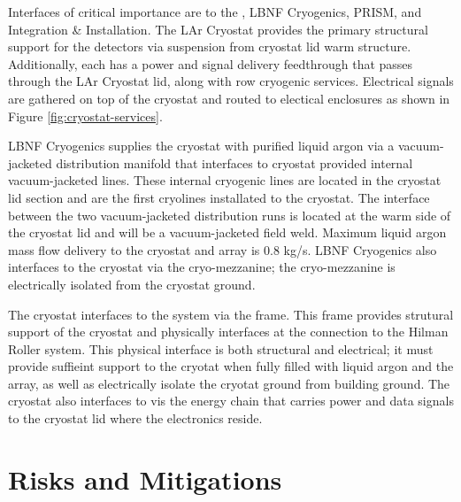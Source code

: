 Interfaces of critical importance are to the , LBNF Cryogenics, PRISM, and Integration \& Installation.  The LAr Cryostat provides the primary structural support for the  detectors via suspension from cryostat lid warm structure.  Additionally, each  has a power and signal delivery feedthrough that passes through the LAr Cryostat lid, along with  row cryogenic services.  Electrical signals are gathered on top of the cryostat and routed to electical enclosures as shown in Figure \ref{fig:cryostat-services}.

LBNF Cryogenics supplies the  cryostat with purified liquid argon via a vacuum-jacketed distribution manifold that interfaces to  cryostat provided internal vacuum-jacketed lines. These internal cryogenic lines are located in the cryostat lid section and are the first cryolines installated to the  cryostat.  The interface between the two vacuum-jacketed distribution runs is located at the warm side of the cryostat lid and will be a vacuum-jacketed field weld.  Maximum liquid argon mass flow delivery to the  cryostat and  array is 0.8 kg/s. LBNF Cryogenics also interfaces to the cryostat via the cryo-mezzanine; the cryo-mezzanine is electrically isolated from the cryostat ground.  

The  cryostat interfaces to the  system via the  frame.  This frame provides strutural support of the cryostat and physically interfaces at the connection to the Hilman Roller system.  This physical interface is both structural and electrical; it must provide suffieint support to the cryotat when fully filled with liquid argon and the  array, as well as electrically isolate the cryotat ground from building ground.  The cryostat also interfaces to  vis the energy chain that carries power and data signals to the cryostat lid where the  electronics reside.


\section{Risks and Mitigations}
\label{sec:cryost-risks}

